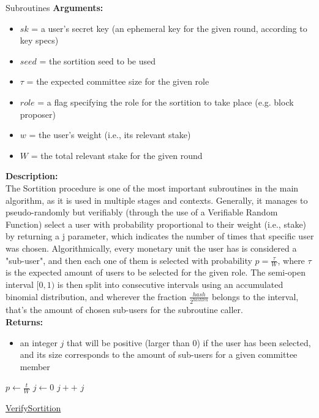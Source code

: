 \documentclass[10pt,a4paper]{article}
\begin{document}
\begin{section}{Subroutines}
\noindent \textbf{Arguments:}
\begin{itemize}
    \item $sk$ = a user's secret key (an ephemeral key for the given round, according to key specs)
    \item $seed$ = the sortition seed to be used
    \item $\tau$ = the expected committee size for the given role
    \item $role$ = a flag specifying the role for the sortition to take place (e.g. block proposer)
    \item $w$ = the user's weight (i.e., its relevant stake)
    \item $W$ = the total relevant stake for the given round
\end{itemize}

\noindent \textbf{Description:}\\
The Sortition procedure is one of the most important subroutines in the main algorithm, as it is 
used in multiple stages and contexts.
Generally, it manages to pseudo-randomly but verifiably (through the use of a Verifiable Random 
Function) select a user with probability proportional
to their weight (i.e., stake) by returning a j parameter, which indicates the number of times that 
specific user was chosen.
Algorithmically, every monetary unit the user has is considered a "sub-user", and then each one 
of them is selected with probability $p = \frac{\tau}{W}$,
where $\tau$ is the expected amount of users to be selected for the given role.
The semi-open interval $[0,1)$ is then split into consecutive intervals using an accumulated 
binomial distribution, and wherever the fraction $\frac{hash}{2^{hashlen}}$
belongs to the interval, that's the amount of chosen sub-users for the subroutine caller.\\

\noindent \textbf{Returns:}
\begin{itemize}
    \item an integer $j$ that will be positive (larger than 0) if the user has been selected, 
    and its size corresponds to the amount of sub-users for a given committee member
  \end{itemize}



\begin{algorithm}[H]
    \begin{algorithmic}[H]
        \State $p \gets \frac{t}{W}$
        \State $j \gets 0$
        \While{$\frac{hash}{2^{hashlen}} \notin [\sum_{k=0}^j\mathsf{B}(k;w,p), \sum_{k=0}^{j+1}\mathsf{B}(k;w,p))$}
            \State $j++$
        \EndWhile
        \Return $j$
    \EndFunction
    \end{algorithmic}
    \caption{\underline{VerifySortition}}
\end{algorithm}


\end{section}
\end{document}
